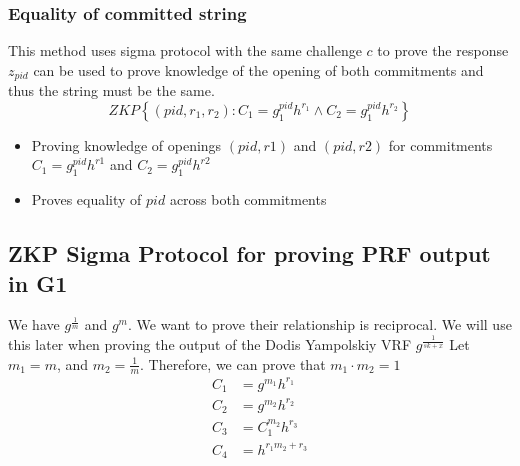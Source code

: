 \subsubsection{Equality of committed string}
This method uses sigma protocol with the same challenge $c$ to prove the response $z_{pid}$ can be used to prove knowledge of the opening of both commitments and thus the string must be the same.
\[
ZKP
    \left\{ 
    (pid, r_1, r_2): C_1 = g_1^{pid} h^{r_1} \wedge C_2 = g_1^{pid} h^{r_2}
    \right\}
\]


\begin{itemize}
    \item Proving knowledge of openings $(pid, r1)$ and $(pid, r2)$ for commitments $C_1 = g_1^{pid}h^{r1}$ and $C_2 = g_1^{pid}h^{r2}$
    \item Proves equality of $pid$ across both commitments
\end{itemize}


\newpage


\subsection{ZKP Sigma Protocol for proving PRF output in G1}
We have $g^{\frac{1}{m}}$ and $g^m$. We want to prove their relationship is reciprocal. We will use this later when proving the output of the Dodis Yampolskiy VRF $g^{\frac{1}{sk + x}}$
Let $m_1 = m$, and $m_2 = \frac{1}{m}$. Therefore, we can prove that $m_1 \cdot m_2 = 1$ 
\[ 
    \begin{aligned}
        C_1 &= g^{m_1}h^{r_1} \\
        C_2 &= g^{m_2}h^{r_2} \\
        C_3 &= C_1^{m_2}h^{r_3} \\ 
        C_4 &= h^{r_1m_2 + r_3} \\ 
    \end{aligned}
\]

